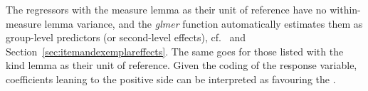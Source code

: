 The regressors with the measure lemma as their unit of reference have no within-measure lemma variance, and the \textit{glmer} function automatically estimates them as group-level predictors (or second-level effects), cf.\ \citet[265--269,302--304]{GelmanHill2006} and Section~\ref{sec:itemandexemplareffects}.
The same goes for those listed with the kind lemma as their unit of reference.
Given the coding of the response variable, coefficients leaning to the positive side can be interpreted as favouring the \PGCa.

\begin{table}
  \centering
\end{table}
